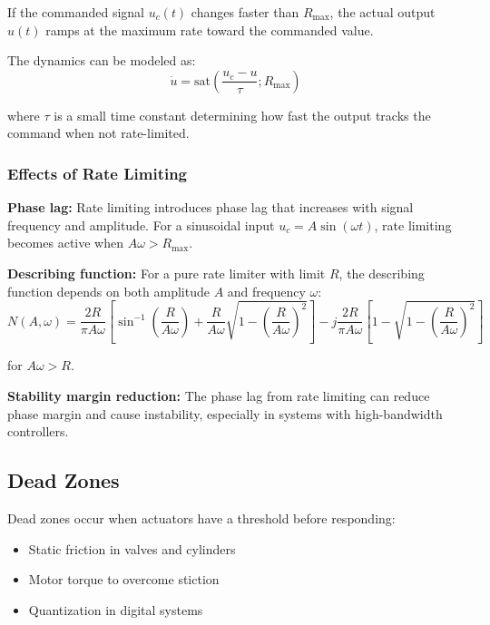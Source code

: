 If the commanded signal $u_c(t)$ changes faster than $R_{\max}$, the actual output $u(t)$ ramps at the maximum rate toward the commanded value.

The dynamics can be modeled as:
\begin{equation}
\dot{u} = \text{sat}\left(\frac{u_c - u}{\tau}; R_{\max}\right)
\label{eq:rate_limiter_model}
\end{equation}

where $\tau$ is a small time constant determining how fast the output tracks the command when not rate-limited.

\subsubsection{Effects of Rate Limiting}

\textbf{Phase lag:} Rate limiting introduces phase lag that increases with signal frequency and amplitude. For a sinusoidal input $u_c = A\sin(\omega t)$, rate limiting becomes active when $A\omega > R_{\max}$.

\textbf{Describing function:} For a pure rate limiter with limit $R$, the describing function depends on both amplitude $A$ and frequency $\omega$:
\begin{equation}
N(A, \omega) = \frac{2R}{\pi A\omega}\left[\sin^{-1}\left(\frac{R}{A\omega}\right) + \frac{R}{A\omega}\sqrt{1 - \left(\frac{R}{A\omega}\right)^2}\right] - j\frac{2R}{\pi A\omega}\left[1 - \sqrt{1 - \left(\frac{R}{A\omega}\right)^2}\right]
\end{equation}

for $A\omega > R$.

\textbf{Stability margin reduction:} The phase lag from rate limiting can reduce phase margin and cause instability, especially in systems with high-bandwidth controllers.

\subsection{Dead Zones}

Dead zones occur when actuators have a threshold before responding:
\begin{itemize}
    \item Static friction in valves and cylinders
    \item Motor torque to overcome stiction
    \item Quantization in digital systems
\end{itemize}


